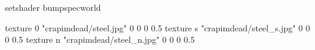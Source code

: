 setshader bumpspecworld

texture 0 "crapimdead/steel.jpg" 0 0 0 0.5
texture s "crapimdead/steel_s.jpg" 0 0 0 0.5
texture n "crapimdead/steel_n.jpg" 0 0 0 0.5
